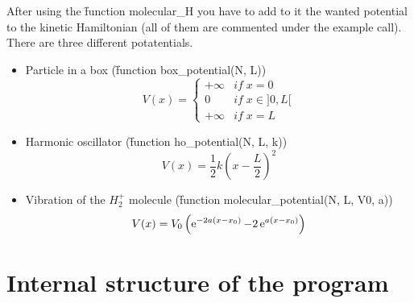 \documentclass[1pt, a4paper]{article}
\begin{document}
After using the \f{function molecular_H} you have to add to it the wanted potential to the kinetic Hamiltonian (all of them are commented under the example call). There are three different potatentials.
\begin{itemize}[leftmargin=15pt, itemsep=0pt, topsep=0pt]
    \item Particle in a box (\f{function box_potential(N, L)})
        \begin{equation}
            V(x) = \left\{\begin{array}{ll}
                            +\infty&if\;x=0\\
                            0\;\quad&if\;x\in ]0,L[\\
                            +\infty&if\;x=L
                          \end{array}\right.
        \end{equation}
    \item Harmonic oscillator (\f{function ho_potential(N, L, k)})
        \begin{equation}
            V(x) = \dfrac{1}{2}k\left(x - \dfrac{L}{2}\right)^2
        \end{equation}
    \item Vibration of the $H_2^+$ molecule (\f{function molecular_potential(N, L, V0, a)})
        \begin{equation}
            V(x) = V_0\left(\operatorname{e}^{-2a(x-x_0)} - 2\operatorname{e}^{a(x-x_0)}\right)
        \end{equation}
\end{itemize}
\newpage
\section{Internal structure of the program}
\label{sec:3}
\noindent


           
\end{document}
